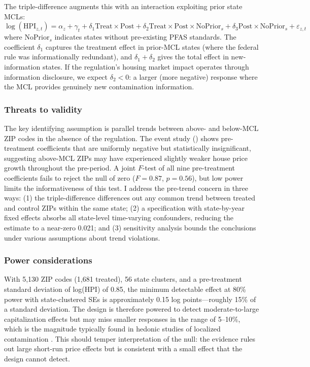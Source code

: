 \documentclass[12pt]{article}
\begin{document}
The triple-difference augments this with an interaction exploiting prior state MCLs:
\begin{equation}
\log(\text{HPI}_{z,t}) = \alpha_z + \gamma_t + \delta_1 \text{Treat} \times \text{Post} + \delta_2 \text{Treat} \times \text{Post} \times \text{NoPrior}_s + \delta_3 \text{Post} \times \text{NoPrior}_s + \varepsilon_{z,t}
\label{eq:ddd}
\end{equation}
where $\text{NoPrior}_s$ indicates states without pre-existing PFAS standards. The coefficient $\delta_1$ captures the treatment effect in prior-MCL states (where the federal rule was informationally redundant), and $\delta_1 + \delta_2$ gives the total effect in new-information states. If the regulation's housing market impact operates through information disclosure, we expect $\delta_2 < 0$: a larger (more negative) response where the MCL provides genuinely new contamination information.

\subsubsection*{Threats to validity} The key identifying assumption is parallel trends between above- and below-MCL ZIP codes in the absence of the regulation. The event study () shows pre-treatment coefficients that are uniformly negative but statistically insignificant, suggesting above-MCL ZIPs may have experienced slightly weaker house price growth throughout the pre-period. A joint $F$-test of all nine pre-treatment coefficients fails to reject the null of zero ($F = 0.87$, $p = 0.56$), but low power limits the informativeness of this test. I address the pre-trend concern in three ways: (1) the triple-difference differences out any common trend between treated and control ZIPs within the same state; (2) a specification with state-by-year fixed effects absorbs all state-level time-varying confounders, reducing the estimate to a near-zero 0.021; and (3) \citet{RambachanRoth2023} sensitivity analysis bounds the conclusions under various assumptions about trend violations.

\subsubsection*{Power considerations} With 5,130 ZIP codes (1,681 treated), 56 state clusters, and a pre-treatment standard deviation of log(HPI) of 0.85, the minimum detectable effect at 80\% power with state-clustered SEs is approximately 0.15 log points---roughly 15\% of a standard deviation. The design is therefore powered to detect moderate-to-large capitalization effects but may miss smaller responses in the range of 5--10\%, which is the magnitude typically found in hedonic studies of localized contamination \citep{Greenstone2006}. This should temper interpretation of the null: the evidence rules out large short-run price effects but is consistent with a small effect that the design cannot detect.
\end{document}
